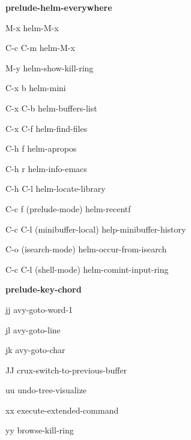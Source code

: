 \documentclass[10pt]{article}
\renewcommand\subsection[1]{\smallskip\par\textbf{\color{heading}#1}}
\renewcommand\subsection[1]{\smallskip\par\textbf{\color{heading}#1}}
\begin{document}
\begin{multicols}{4}
  \subsection{prelude-helm-everywhere}
  \begin{keylist}
  \item[M-x] helm-M-x
  \item[C-c C-m] helm-M-x
  \item[M-y] helm-show-kill-ring
  \item[C-x b] helm-mini
  \item[C-x C-b] helm-buffers-list
  \item[C-x C-f] helm-find-files
  \item[C-h f] helm-apropos
  \item[C-h r] helm-info-emacs
  \item[C-h C-l] helm-locate-library
  \item[C-c f] (prelude-mode) helm-recentf
  \item[C-c C-l] (minibuffer-local)  help-minibuffer-history
  \item[C-o] (isearch-mode) helm-occur-from-isearch
  \item[C-c C-l] (shell-mode) helm-comint-input-ring
  \end{keylist}

  \subsection{prelude-key-chord}
  \begin{keylist}
  \item[jj] avy-goto-word-1
  \item[jl] avy-goto-line
  \item[jk] avy-goto-char
  \item[JJ] crux-switch-to-previous-buffer
  \item[uu] undo-tree-visualize
  \item[xx] execute-extended-command
  \item[yy] browse-kill-ring
  \end{keylist}


\end{multicols}
\end{document}
